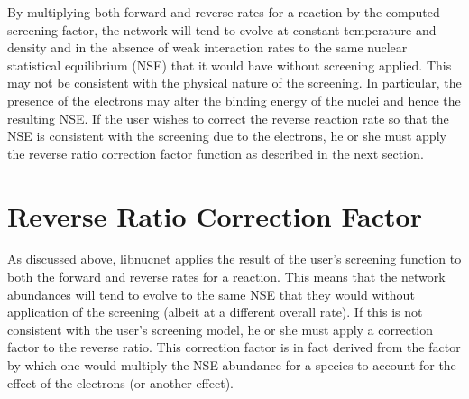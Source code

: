 \documentclass{article}    %
\begin{document}
By multiplying both forward and reverse rates for a reaction by the
computed screening factor,
the network will tend to evolve at constant temperature and density and
in the absence of weak interaction rates to the same nuclear statistical
equilibrium (NSE) that it would have
without screening applied.  This may not be consistent with the physical
nature of the screening.  In particular, the presence of the electrons
may alter the binding energy of the nuclei and hence the resulting NSE.
If the user wishes to correct the reverse
reaction rate so that the NSE is consistent with the screening due to the
electrons, he or she must apply the reverse ratio correction factor
function as described in the next section.

\section{Reverse Ratio Correction Factor}

As discussed above, libnucnet applies the result of the user's screening
function to both the forward and reverse rates for a reaction.  This means
that the network abundances will tend to evolve to the same NSE that they
would without application of the screening (albeit at a different overall
rate).  If this is not consistent with the user's screening model, he or she
must apply a correction factor to the reverse ratio.  This correction factor
is in fact derived from the
factor by which one would multiply the NSE abundance for
a species to account for the effect of the electrons (or another effect).
\end{document}
